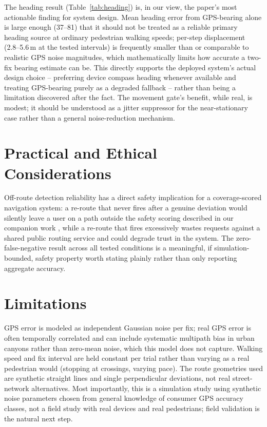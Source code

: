 \documentclass[conference]{IEEEtran}
\begin{document}
The heading result (Table~\ref{tab:heading}) is, in our view, the paper's most actionable finding for system design. Mean heading error from GPS-bearing alone is large enough (37--81\textdegree) that it should not be treated as a reliable primary heading source at ordinary pedestrian walking speeds; per-step displacement (2.8--5.6\,m at the tested intervals) is frequently smaller than or comparable to realistic GPS noise magnitudes, which mathematically limits how accurate a two-fix bearing estimate can be. This directly supports the deployed system's actual design choice -- preferring device compass heading whenever available and treating GPS-bearing purely as a degraded fallback -- rather than being a limitation discovered after the fact. The movement gate's benefit, while real, is modest; it should be understood as a jitter suppressor for the near-stationary case rather than a general noise-reduction mechanism.

\section{Practical and Ethical Considerations}

Off-route detection reliability has a direct safety implication for a coverage-scored navigation system: a re-route that never fires after a genuine deviation would silently leave a user on a path outside the safety scoring described in our companion work \cite{ourscoring}, while a re-route that fires excessively wastes requests against a shared public routing service and could degrade trust in the system. The zero-false-negative result across all tested conditions is a meaningful, if simulation-bounded, safety property worth stating plainly rather than only reporting aggregate accuracy.

\section{Limitations}

GPS error is modeled as independent Gaussian noise per fix; real GPS error is often temporally correlated and can include systematic multipath bias in urban canyons rather than zero-mean noise, which this model does not capture. Walking speed and fix interval are held constant per trial rather than varying as a real pedestrian would (stopping at crossings, varying pace). The route geometries used are synthetic straight lines and single perpendicular deviations, not real street-network alternatives. Most importantly, this is a simulation study using synthetic noise parameters chosen from general knowledge of consumer GPS accuracy classes, not a field study with real devices and real pedestrians; field validation is the natural next step.
\end{document}
